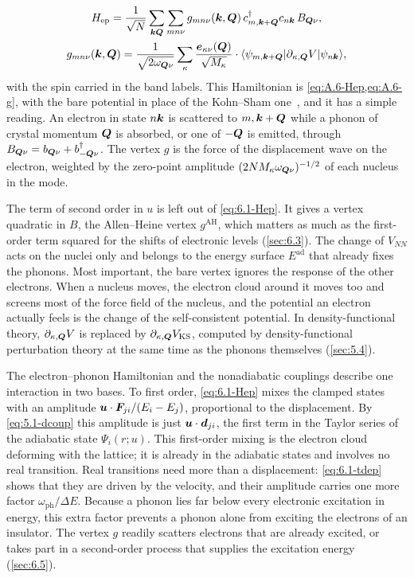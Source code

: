 \begin{gather}
  H_{\mathrm{ep}} = \frac{1}{\sqrt N}\sum_{\bm{k}\bm{Q}}\sum_{mn\nu}g_{mn\nu}(\bm{k},\bm{Q})\,c^\dagger_{m,\bm{k}+\bm{Q}}c_{n\bm{k}}\,B_{\bm{Q}\nu} ,
  \nonumber\\
  g_{mn\nu}(\bm{k},\bm{Q}) = \frac{1}{\sqrt{2\omega_{\bm{Q}\nu}}}\sum_\kappa\frac{\bm{e}_{\kappa\nu}(\bm{Q})}{\sqrt{M_\kappa}}\cdot\langle\psi_{m,\bm{k}+\bm{Q}}|\partial_{\kappa,\bm{Q}}V|\psi_{n\bm{k}}\rangle ,
  \label{eq:6.1-Hep}
\end{gather}
with the spin carried in the band labels. This Hamiltonian is \cref{eq:A.6-Hep,eq:A.6-g}, with the bare potential in place of the Kohn--Sham one~\cite[Eqs.~(31)--(38)]{giustino2017electron}, and it has a simple reading. An electron in state $n\bm{k}$ is scattered to $m,\bm{k}+\bm{Q}$ while a phonon of crystal momentum $\bm{Q}$ is absorbed, or one of $-\bm{Q}$ is emitted, through $B_{\bm{Q}\nu} = b_{\bm{Q}\nu} + b^\dagger_{-\bm{Q}\nu}$. The vertex $g$ is the force of the displacement wave on the electron, weighted by the zero-point amplitude $(2NM_\kappa\omega_{\bm{Q}\nu})^{-1/2}$ of each nucleus in the mode.

The term of second order in $u$ is left out of \cref{eq:6.1-Hep}. It gives a vertex quadratic in $B$, the Allen--Heine vertex $g^{\mathrm{AH}}$, which matters as much as the first-order term squared for the shifts of electronic levels (\cref{sec:6.3}). The change of $V_{NN}$ acts on the nuclei only and belongs to the energy surface $E^{\mathrm{ad}}$ that already fixes the phonons. Most important, the bare vertex ignores the response of the other electrons. When a nucleus moves, the electron cloud around it moves too and screens most of the force field of the nucleus, and the potential an electron actually feels is the change of the self-consistent potential. In density-functional theory, $\partial_{\kappa,\bm{Q}}V$ is replaced by $\partial_{\kappa,\bm{Q}}V_{\mathrm{KS}}$, computed by density-functional perturbation theory at the same time as the phonons themselves (\cref{sec:5.4}).

The electron--phonon Hamiltonian and the nonadiabatic couplings describe one interaction in two bases. To first order, \cref{eq:6.1-Hep} mixes the clamped states with an amplitude $\bm{u}\cdot\bm{F}_{ji}/(E_i - E_j)$, proportional to the displacement. By \cref{eq:5.1-dcoup} this amplitude is just $\bm{u}\cdot\bm{d}_{ji}$, the first term in the Taylor series of the adiabatic state $\Psi_i(r;u)$. This first-order mixing is the electron cloud deforming with the lattice; it is already in the adiabatic states and involves no real transition. Real transitions need more than a displacement: \cref{eq:6.1-tdep} shows that they are driven by the velocity, and their amplitude carries one more factor $\omega_{\mathrm{ph}}/\Delta E$. Because a phonon lies far below every electronic excitation in energy, this extra factor prevents a phonon alone from exciting the electrons of an insulator. The vertex $g$ readily scatters electrons that are already excited, or takes part in a second-order process that supplies the excitation energy (\cref{sec:6.5}).

